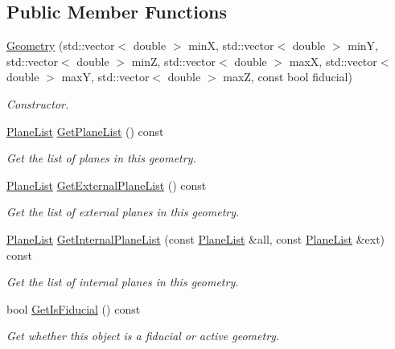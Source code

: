 \subsection*{Public Member Functions}
\begin{DoxyCompactItemize}
\item 
\hyperlink{classcalib_1_1Geometry_a698f1d0a1db5842c756c56309396f419}{Geometry} (std\-::vector$<$ double $>$ min\-X, std\-::vector$<$ double $>$ min\-Y, std\-::vector$<$ double $>$ min\-Z, std\-::vector$<$ double $>$ max\-X, std\-::vector$<$ double $>$ max\-Y, std\-::vector$<$ double $>$ max\-Z, const bool fiducial)
\begin{DoxyCompactList}\small\item\em Constructor. \end{DoxyCompactList}\item 
\hyperlink{classcalib_1_1Geometry_a85d1d4140e153e7d0e423208954107aa}{Plane\-List} \hyperlink{classcalib_1_1Geometry_a87e42e5c2630ce89fc71d2bbc856b004}{Get\-Plane\-List} () const 
\begin{DoxyCompactList}\small\item\em Get the list of planes in this geometry. \end{DoxyCompactList}\item 
\hyperlink{classcalib_1_1Geometry_a85d1d4140e153e7d0e423208954107aa}{Plane\-List} \hyperlink{classcalib_1_1Geometry_a02298a8777942b97a457eeeb561bb403}{Get\-External\-Plane\-List} () const 
\begin{DoxyCompactList}\small\item\em Get the list of external planes in this geometry. \end{DoxyCompactList}\item 
\hyperlink{classcalib_1_1Geometry_a85d1d4140e153e7d0e423208954107aa}{Plane\-List} \hyperlink{classcalib_1_1Geometry_a7a60f6a38ecee567a5fea597407cb788}{Get\-Internal\-Plane\-List} (const \hyperlink{classcalib_1_1Geometry_a85d1d4140e153e7d0e423208954107aa}{Plane\-List} \&all, const \hyperlink{classcalib_1_1Geometry_a85d1d4140e153e7d0e423208954107aa}{Plane\-List} \&ext) const 
\begin{DoxyCompactList}\small\item\em Get the list of internal planes in this geometry. \end{DoxyCompactList}\item 
bool \hyperlink{classcalib_1_1Geometry_a3cb5182aa01c97e053736f01bb331366}{Get\-Is\-Fiducial} () const 
\begin{DoxyCompactList}\small\item\em Get whether this object is a fiducial or active geometry. \end{DoxyCompactList}\item 

\end{DoxyCompactItemize}
